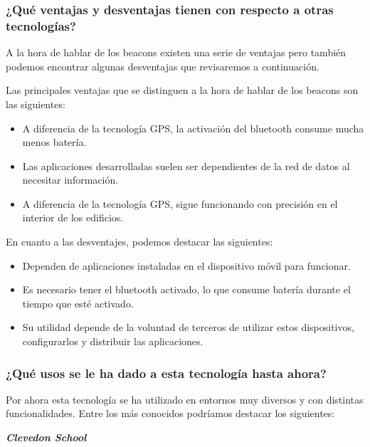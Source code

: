 \subsubsection{¿Qué ventajas y desventajas tienen con respecto a otras tecnologías?}

A la hora de hablar de los beacons existen una serie de ventajas pero también podemos encontrar algunas desventajas que revisaremos a continuación. 

Las principales ventajas que se distinguen a la hora de hablar de los beacons son las siguientes: 

\begin{itemize}
\item A diferencia de la tecnología GPS, la activación del bluetooth consume mucha menos batería. 
\item Las aplicaciones desarrolladas suelen ser dependientes de la red de datos al necesitar información. 
\item A diferencia de la tecnología GPS, sigue funcionando con precisión en el interior de los edificios.
\end{itemize}

En cuanto a las desventajes, podemos destacar las siguientes:

\begin{itemize}
\item Dependen de aplicaciones instaladas en el dispositivo móvil para funcionar. 
\item Es necesario tener el bluetooth activado, lo que consume batería durante el tiempo que esté activado. 
\item Su utilidad depende de la voluntad de terceros de utilizar estos dispositivos, configurarlos y distribuir las aplicaciones.
\end{itemize}

\subsubsection{¿Qué usos se le ha dado a esta tecnología hasta ahora?}

Por ahora esta tecnología se ha utilizado en entornos muy diversos y con distintas funcionalidades. Entre los más conocidos podríamos destacar los siguientes: 

\vspace{5mm}

\textsl{\textbf{{Clevedon School}}}

\vspace{2mm}

